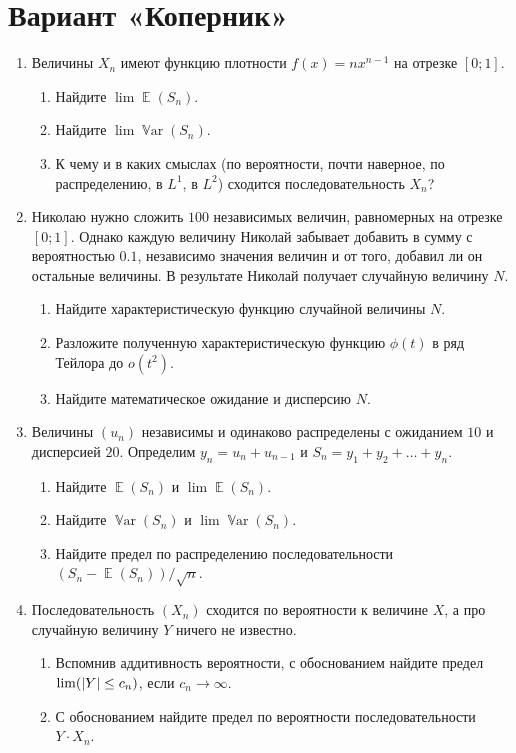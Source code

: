 \documentclass[12pt]{article}
\DeclareMathOperator{\Var}{\mathbb{V}ar}
\let\P\relax
\DeclareMathOperator{\P}{\mathbb{P}}
\DeclarePairedDelimiter{\abs}{\lvert}{\rvert}
\DeclareMathOperator{\E}{\mathbb{E}}
\begin{document}
\section*{Вариант «Коперник»}

\begin{enumerate}
    \item Величины $X_n$ имеют функцию плотности $f(x) = n x^{n-1}$ на отрезке $[0;1]$.
    \begin{enumerate}
        \item Найдите $\lim \E(S_n)$.
        \item Найдите $\lim \Var(S_n)$.
        \item К чему и в каких смыслах (по вероятности, почти наверное, по распределению, в $L^1$, в $L^2$) сходится последовательность $X_n$?
    \end{enumerate}

    \item Николаю нужно сложить $100$ независимых величин, равномерных на отрезке $[0;1]$.
    Однако каждую величину Николай забывает добавить в сумму с вероятностью $0.1$, независимо значения величин и от того, добавил ли он остальные величины. 
    В результате Николай получает случайную величину $N$.

    \begin{enumerate}
        \item Найдите характеристическую функцию случайной величины $N$.
        \item Разложите полученную характеристическую функцию $\phi(t)$ в ряд Тейлора до $o(t^2)$.
        \item Найдите математическое ожидание и дисперсию $N$.
    \end{enumerate}


    \item Величины $(u_n)$ независимы и одинаково распределены с ожиданием $10$ и дисперсией $20$.
    Определим $y_n = u_n + u_{n-1}$ и $S_n = y_1 + y_2 + \dots + y_n$.

    \begin{enumerate}
        \item Найдите $\E(S_n)$ и $\lim \E(S_n)$.
        \item Найдите $\Var(S_n)$ и $\lim \Var(S_n)$.
        \item Найдите предел по распределению последовательности $(S_n - \E(S_n))/\sqrt{n}$.
    \end{enumerate}

    \item Последовательность $(X_n)$ сходится по вероятности к величине $X$, а про случайную величину $Y$ ничего не известно. 
    \begin{enumerate}
        \item Вспомнив аддитивность вероятности, с обоснованием найдите предел $\lim \P(\abs{Y} \leq c_n)$, если $c_n \to \infty$. 
        \item С обоснованием найдите предел по вероятности последовательности $Y \cdot X_n$. 
    \end{enumerate}


\end{enumerate}
\end{document}
